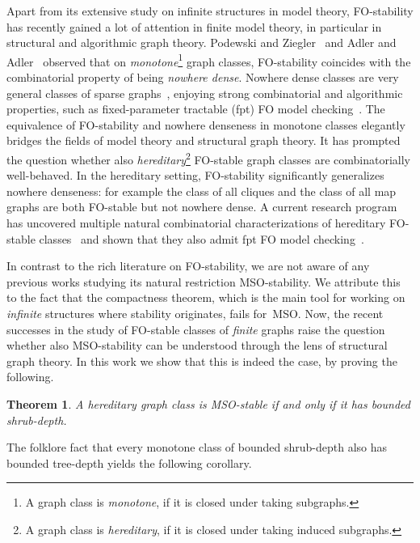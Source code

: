 \documentclass[11pt]{article}      \usepackage[margin=1in]{geometry}  \usepackage{microtype}
\newtheorem{theorem}{Theorem}[section]
\theoremstyle{definition}
\begin{document}
Apart from its extensive study on infinite structures in model theory, FO-stability has recently gained a lot of attention in finite model theory, in particular in structural and algorithmic graph theory. 
Podewski and Ziegler~\cite{stable_graphs} and Adler and Adler~\cite{adler2014interpreting} observed that on \emph{monotone}\footnote{A graph class is \emph{monotone}, if it is closed under taking subgraphs.} graph classes, FO-stability coincides with the combinatorial property of being \emph{nowhere dense}.
Nowhere dense classes are very general classes of sparse graphs~\cite{nevsetvril2011nowhere}, 
enjoying strong combinatorial and algorithmic properties, such as fixed-parameter tractable (fpt) FO model checking~\cite{grohe2017deciding}.
The equivalence of FO-stability and nowhere denseness in monotone classes elegantly bridges the fields of model theory and structural graph theory.
It has prompted the question whether also \emph{hereditary}\footnote{A graph class is \emph{hereditary}, if it is closed under taking induced subgraphs.} FO-stable graph classes are combinatorially well-behaved.
In the hereditary setting, FO-stability significantly generalizes nowhere denseness: for example the class of all cliques and the class of all map graphs are both FO-stable but not nowhere dense.
A current research program has uncovered multiple natural combinatorial characterizations of hereditary FO-stable classes~\cite{dreier2024stablemc, dreier2022indiscernibles, flipper-game, buffiere2024shallow} and shown that they also admit fpt FO model checking~\cite{flipper-game,dreier2024stablemc,dreier2023ssmc}.

In contrast to the rich literature on FO-stability, we are not aware of any previous works studying its natural restriction MSO-stability.
We attribute this to the fact that the compactness theorem, which is the main tool for working on \emph{infinite} structures where stability originates, fails for~MSO.
Now, the recent successes in the study of FO-stable classes of \emph{finite} graphs raise the question whether also MSO-stability can be understood through the lens of structural graph theory.
In this work we show that this is indeed the case, by proving the following.

\begin{theorem}\label{thm:mso-stable}
  A hereditary graph class is MSO-stable if and only if it has bounded shrub-depth.
\end{theorem}

The folklore fact that every monotone class of bounded shrub-depth also has bounded tree-depth yields the following corollary.
\end{document}
